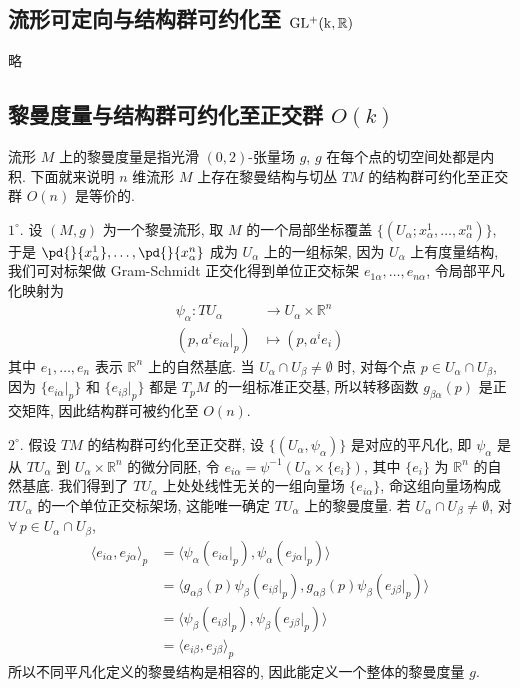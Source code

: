     \subsection{流形可定向与结构群可约化至 ${\rm GL^+(k,\mathbb{R})}$}
    略

    \subsection{黎曼度量与结构群可约化至正交群 $O(k)$}
    流形 $M$ 上的黎曼度量是指光滑 $(0,2)$-张量场 $g$, $g$ 在每个点的切空间处都是内积.
    下面就来说明 $n$ 维流形 $M$ 上存在黎曼结构与切丛 $TM$ 的结构群可约化至正交群 $O(n)$ 是等价的.

    $1^{\circ}.$ 设 $(M,g)$ 为一个黎曼流形, 取 $M$ 的一个局部坐标覆盖 $\{(U_{\alpha};x^1_{\alpha},\dots,x^n_{\alpha})\}$, 于是 $\pd{}{x^1_{\alpha}},\dots,\pd{}{x^n_{\alpha}}$ 成为 $U_{\alpha}$ 上的一组标架, 因为 $U_{\alpha}$ 上有度量结构, 
    我们可对标架做 Gram-Schmidt 正交化得到单位正交标架 $e_{1\alpha},\dots,e_{n\alpha}$, 令局部平凡化映射为
    \begin{align*}
        \psi_{\alpha}:TU_{\alpha}&\rightarrow U_{\alpha}\times\mathbb{R}^n \\
        (p,a^ie_{i\alpha}|_p)&\mapsto(p,a^ie_i)
    \end{align*}
    其中 $e_1,\dots,e_n$ 表示 $\mathbb{R}^n$ 上的自然基底. 当 $U_{\alpha}\cap U_{\beta}\neq\emptyset$ 时, 对每个点 $p\in U_{\alpha}\cap U_{\beta}$, 因为 $\{e_{i\alpha}|_p\}$ 和 $\{e_{i\beta}|_p\}$ 都是 $T_pM$ 的一组标准正交基, 
    所以转移函数 $g_{\beta\alpha}(p)$ 是正交矩阵, 因此结构群可被约化至 $O(n)$.

    $2^{\circ}.$ 假设 $TM$ 的结构群可约化至正交群, 设 $\{(U_{\alpha},\psi_{\alpha})\}$ 是对应的平凡化, 即 $\psi_{\alpha}$ 是从 $TU_{\alpha}$ 到 $U_{\alpha}\times\mathbb{R}^n$ 的微分同胚, 
    令 $e_{i\alpha} = \psi^{-1}(U_{\alpha}\times \{e_i\})$, 其中 $\{e_i\}$ 为 $\mathbb{R}^n$ 的自然基底. 我们得到了 $TU_{\alpha}$ 上处处线性无关的一组向量场 $\{e_{i\alpha}\}$, 命这组向量场构成 $TU_{\alpha}$ 的一个单位正交标架场, 这能唯一确定 $TU_{\alpha}$ 上的黎曼度量.
    若 $U_{\alpha}\cap U_{\beta}\neq\emptyset$, 对 $\forall\,p\in U_{\alpha}\cap U_{\beta}$, 
    \begin{align*}
        \langle e_{i\alpha},e_{j\alpha}\rangle_p &= \langle\psi_{\alpha}(e_{i\alpha}|_p),\psi_{\alpha}(e_{j\alpha}|_p)\rangle \\
        &= \langle g_{\alpha\beta}(p)\psi_{\beta}(e_{i\beta}|_p),g_{\alpha\beta}(p)\psi_{\beta}(e_{j\beta}|_p)\rangle \\
        &= \langle\psi_{\beta}(e_{i\beta}|_p),\psi_{\beta}(e_{j\beta}|_p)\rangle \\
        &= \langle e_{i\beta},e_{j\beta}\rangle_p
    \end{align*}
    所以不同平凡化定义的黎曼结构是相容的, 因此能定义一个整体的黎曼度量 $g$.

